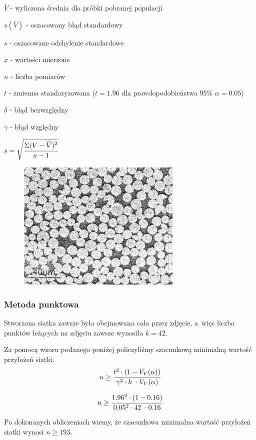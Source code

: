 \documentclass[a4paper,12pt]{article}
\begin{document}
$\overline{V}$ - wyliczona średnia dla próbki pobranej populacji

$s(\overline{V})$ - oszacowany błąd standardowy

$s$ - oszacowane odchylenie standardowe

$x$ - wartości mierzone 

$n$ - liczba pomiarów

$t$ - zmienna standaryzowana ($t=1.96$ dla prawdopodobieństwa $95\%$ $\alpha=0.05$)

$\delta$ - błąd bezwzględny

$\gamma$ - błąd względny

$s=\sqrt{\cfrac{\Sigma (V-\overline{V})^2}{n-1}}$

\begin{figure}[H]
    \centering
    \includegraphics[width=0.7\textwidth]{img/VV.png}
\end{figure}

\newpage

\subsubsection{Metoda punktowa}

{\color{purple}
Stworzona siatka zawsze była obejmowana cała przez zdjęcie, a~więc liczba punktów leżących na zdjęciu zawsze wynosiła $k=42$. }

{\color{blue} Za pomocą wzoru podanego poniżej policzyliśmy szacunkową minimalną wartość przyłożeń siatki.
$$n\ge \cfrac{t^2 \cdot (1-V_V(\alpha))}{\gamma^2 \cdot k~\cdot V_V(\alpha)}$$

$$n\ge \cfrac{1.96^2 \cdot (1-0.16)}{0.05^2 \cdot 42~\cdot 0.16}$$
}

Po dokonanych obliczeniach wiemy, że szacunkowa minimalna wartość przyłożeń siatki wynosi $n\ge 193$.
\end{document}
